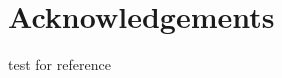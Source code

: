 \chapter*{Acknowledgements} \label{ch: preface}

test for reference \cite{book_MHD}


\cleardoublepage
